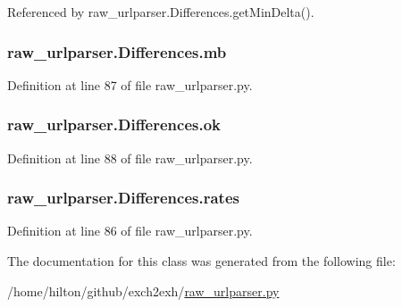 Referenced by raw\-\_\-urlparser.\-Differences.\-get\-Min\-Delta().

\hypertarget{classraw__urlparser_1_1_differences_ab4c3073b8c569b7791ab3b8e21e9b364}{
\subsubsection[{mb}]{\setlength{\rightskip}{0pt plus 5cm}raw\-\_\-urlparser.\-Differences.\-mb}}\label{classraw__urlparser_1_1_differences_ab4c3073b8c569b7791ab3b8e21e9b364}


Definition at line 87 of file raw\-\_\-urlparser.\-py.

\hypertarget{classraw__urlparser_1_1_differences_a46fe97bedb977585a0b27d7408ace118}{
\subsubsection[{ok}]{\setlength{\rightskip}{0pt plus 5cm}raw\-\_\-urlparser.\-Differences.\-ok}}\label{classraw__urlparser_1_1_differences_a46fe97bedb977585a0b27d7408ace118}


Definition at line 88 of file raw\-\_\-urlparser.\-py.

\hypertarget{classraw__urlparser_1_1_differences_ad4e7eadb659a1cdcba90793cc52af174}{
\subsubsection[{rates}]{\setlength{\rightskip}{0pt plus 5cm}raw\-\_\-urlparser.\-Differences.\-rates}}\label{classraw__urlparser_1_1_differences_ad4e7eadb659a1cdcba90793cc52af174}


Definition at line 86 of file raw\-\_\-urlparser.\-py.



The documentation for this class was generated from the following file\-:\begin{DoxyCompactItemize}
\item 
/home/hilton/github/exch2exh/\hyperlink{raw__urlparser_8py}{raw\-\_\-urlparser.\-py}\end{DoxyCompactItemize}
